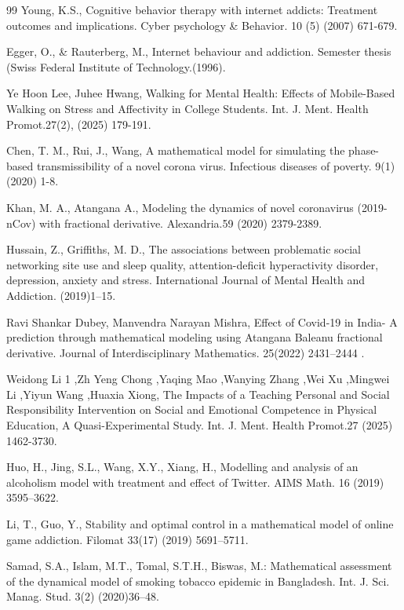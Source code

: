 \documentclass[10pt]{NSP1}
\begin{document}
\begin{thebibliography}{99}
		Young, K.S., Cognitive behavior therapy with internet addicts: Treatment outcomes and implications. Cyber psychology \& Behavior. 10 (5) (2007) 671-679.
		
		Egger, O., \& Rauterberg, M., Internet behaviour and addiction. Semester thesis (Swiss Federal Institute of Technology.(1996).
		
		Ye Hoon Lee, Juhee Hwang, Walking for Mental Health: Effects of Mobile-Based Walking on Stress and Affectivity in College Students. Int. J. Ment. Health Promot.27(2), (2025) 179-191.
		
		Chen, T. M., Rui, J., Wang, A mathematical model for simulating the phase-based transmissibility of a novel corona virus. Infectious diseases of poverty. 9(1)(2020) 1-8.
		
		Khan, M. A., Atangana A., Modeling the dynamics of novel coronavirus (2019-nCov) with fractional derivative. Alexandria.59 (2020) 2379-2389.
		
		Hussain, Z., Griffiths, M. D., The associations between problematic social networking site use and sleep quality, attention-deficit hyperactivity disorder, depression, anxiety and stress. International Journal of Mental Health and Addiction. (2019)1–15.
		
		Ravi Shankar Dubey, Manvendra Narayan Mishra, Effect of Covid-19 in India- A prediction through mathematical modeling using Atangana Baleanu fractional derivative. Journal of Interdisciplinary Mathematics. 25(2022) 2431–2444 .
		
		Weidong Li 1 ,Zh Yeng Chong ,Yaqing Mao ,Wanying Zhang ,Wei Xu ,Mingwei Li ,Yiyun Wang ,Huaxia Xiong, The Impacts of a Teaching Personal and Social Responsibility Intervention on Social and Emotional Competence in Physical Education, A Quasi-Experimental Study. Int. J. Ment. Health Promot.27 (2025) 1462-3730.
		
		Huo, H., Jing, S.L., Wang, X.Y., Xiang, H., Modelling and analysis of an alcoholism model with treatment and effect of Twitter. AIMS Math. 16 (2019) 3595–3622.
		
		Li, T., Guo, Y., Stability and optimal control in a mathematical model of online game addiction. Filomat 33(17) (2019) 5691–5711.
		
		Samad, S.A., Islam, M.T., Tomal, S.T.H., Biswas, M.: Mathematical assessment of the dynamical model of smoking tobacco epidemic in Bangladesh. Int. J. Sci. Manag. Stud. 3(2) (2020)36–48.
		

\end{thebibliography}
\end{document}
